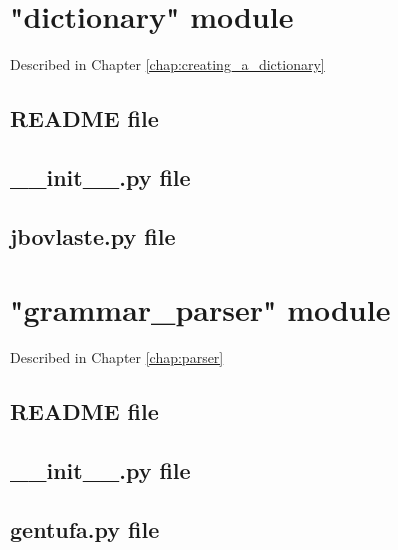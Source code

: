 \chapter{"dictionary" module}
\label{appendix:jbovlaste-annex}

Described in Chapter \ref{chap:creating_a_dictionary}

\section{README file}



\section{\_\_init\_\_.py file}



\section{jbovlaste.py file}



\chapter{"grammar\_parser" module}
\label{appendix:gentufa-annex}

Described in Chapter \ref{chap:parser}

\section{README file}



\newpage

\section{\_\_init\_\_.py file}



\section{gentufa.py file}


